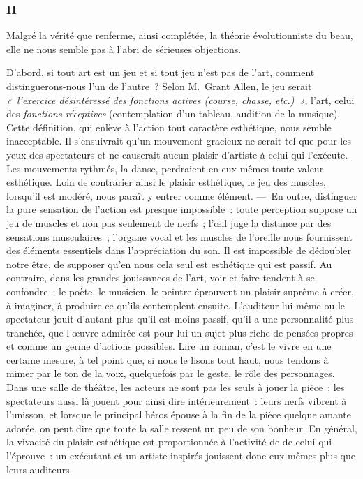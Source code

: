 \documentclass[french,twoside]{book} %
\begin{document}
\subsubsection[{II}]{II}
\noindent Malgré la vérité que renferme, ainsi complétée, la théorie évolutionniste du beau, elle ne nous semble pas à l’abri de sérieuses objections.\par
D’abord, si tout art est un jeu et si tout jeu n’est pas de l’art, comment distinguerons-nous l’un de l’autre ? Selon M. Grant Allen, le jeu serait \emph{« l’exercice désintéressé des fonctions \emph{actives} (course, chasse, etc.) »}, l’art,  celui des \emph{fonctions réceptives} (contemplation d’un tableau, audition de la musique). Cette définition, qui enlève à l’action tout caractère esthétique, nous semble inacceptable. Il s’ensuivrait qu’un mouvement gracieux ne serait tel que pour les yeux des spectateurs et ne causerait aucun plaisir d’artiste à celui qui l’exécute. Les mouvements rythmés, la danse, perdraient en eux-mêmes toute valeur esthétique. Loin de contrarier ainsi le plaisir esthétique, le jeu des muscles, lorsqu’il est modéré, nous paraît y entrer comme élément. — En outre, distinguer la pure sensation de l’action est presque impossible : toute perception suppose un jeu de muscles et non pas seulement de nerfs ; l’œil juge la distance par des sensations musculaires ; l’organe vocal et les muscles de l’oreille nous fournissent des éléments essentiels dans l’appréciation du son. Il est impossible de dédoubler notre être, de supposer qu’en nous cela seul est esthétique qui est passif. Au contraire, dans les grandes jouissances de l’art, voir et faire tendent à se confondre ; le poète, le musicien, le peintre éprouvent un plaisir suprême à créer, à imaginer, à produire ce qu’ils contemplent ensuite. L’auditeur lui-même ou le spectateur jouit d’autant plus qu’il est moins passif, qu’il a une personnalité plus tranchée, que l’œuvre admirée est pour lui un sujet plus riche de pensées propres et comme un germe d’actions possibles. Lire un roman, c’est le vivre en une certaine mesure, à tel point que, si nous le lisons tout haut, nous tendons à mimer par le ton de la voix, quelquefois par le geste, le rôle des personnages. Dans une salle de théâtre, les acteurs ne sont pas les seuls à jouer la pièce ; les spectateurs aussi  là jouent pour ainsi dire intérieurement : leurs nerfs vibrent à l’unisson, et lorsque le principal héros épouse à la fin de la pièce quelque amante adorée, on peut dire que toute la salle ressent un peu de son bonheur. En général, la vivacité du plaisir esthétique est proportionnée à l’activité de de celui qui l’éprouve : un exécutant et un artiste inspirés jouissent donc eux-mêmes plus que leurs auditeurs.\par
\end{document}
